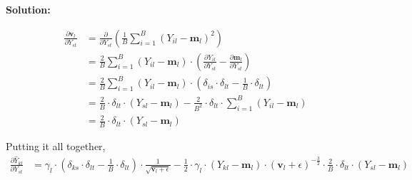 \documentclass{article}
\newenvironment{solution}
  {\par\noindent\textbf{Solution:}\par}
  {\par}
\begin{document}
\begin{solution}
  \[
    \begin{aligned}
      \frac{\partial \textbf{v}_l}{\partial Y_{st}} &= \frac{\partial}{\partial Y_{st}} \left(\frac{1}{B} \sum_{i=1}^B (Y_{il} - \textbf{m}_l)^2\right) \\ 
                                                    &= \frac{2}{B} \sum_{i=1}^B (Y_{il} - \textbf{m}_l)\cdot\left(\frac{\partial Y_{il}}{\partial Y_{st}} - \frac{\partial \textbf{m}_l}{\partial Y_{st}}\right) \\ 
                                                    &= \frac{2}{B} \sum_{i=1}^B (Y_{il} - \textbf{m}_l) \cdot (\delta_{is}\cdot \delta_{lt} -\frac{1}{B} \cdot \delta_{lt}) \\ 
                                                    &= \frac{2}{B} \cdot \delta_{lt} \cdot (Y_{sl} - \textbf{m}_l) -\frac{2}{B^2} \cdot \delta_{lt} \cdot \sum_{i=1}^B (Y_{il} - \textbf{m}_l) \\ 
                                                    &= \frac{2}{B} \cdot \delta_{lt} \cdot (Y_{sl} - \textbf{m}_l)
    \end{aligned}
  \]

  Putting it all together,
  \[ 
    \begin{aligned}
      \frac{\partial \hat{Y}_{kl}}{\partial Y_{st}} &=  \gamma_l \cdot (\delta_{ks}\cdot \delta_{lt}- \frac{1}{B} \cdot \delta_{lt})\cdot \frac{1}{\sqrt{\textbf{v}_l + \epsilon}} -\frac{1}{2} \cdot \gamma_l \cdot (Y_{kl} -\textbf{m}_l)\cdot (\textbf{v}_l + \epsilon)^{-\frac{3}{2}}\cdot \frac{2}{B} \cdot \delta_{lt} \cdot (Y_{sl} - \textbf{m}_l)
    \end{aligned}
  \]


\end{solution}
\end{document}
